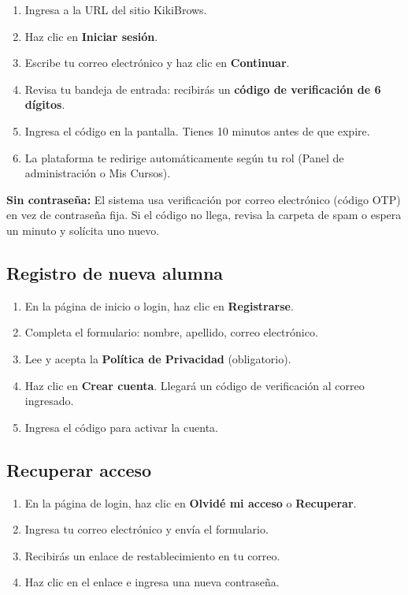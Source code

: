 \documentclass[a4paper,11pt]{article}
\begin{document}
\begin{enumerate}
  \item Ingresa a la URL del sitio KikiBrows.
  \item Haz clic en \textbf{Iniciar sesi\'on}.
  \item Escribe tu correo electr\'onico y haz clic en \textbf{Continuar}.
  \item Revisa tu bandeja de entrada: recibir\'as un \textbf{c\'odigo de verificaci\'on
        de 6 d\'igitos}.
  \item Ingresa el c\'odigo en la pantalla. Tienes 10 minutos antes de que expire.
  \item La plataforma te redirige autom\'aticamente seg\'un tu rol
        (Panel de administraci\'on o Mis Cursos).
\end{enumerate}

\begin{infobox}
\textbf{Sin contrase\~na:} El sistema usa verificaci\'on por correo electr\'onico
(c\'odigo OTP) en vez de contrase\~na fija. Si el c\'odigo no llega, revisa la
carpeta de spam o espera un minuto y sol\'icita uno nuevo.
\end{infobox}

\subsection{Registro de nueva alumna}

\begin{enumerate}
  \item En la p\'agina de inicio o login, haz clic en \textbf{Registrarse}.
  \item Completa el formulario:
        nombre, apellido, correo electr\'onico.
  \item Lee y acepta la \textbf{Pol\'itica de Privacidad} (obligatorio).
  \item Haz clic en \textbf{Crear cuenta}. Llegar\'a un c\'odigo de verificaci\'on
        al correo ingresado.
  \item Ingresa el c\'odigo para activar la cuenta.
\end{enumerate}

\subsection{Recuperar acceso}

\begin{enumerate}
  \item En la p\'agina de login, haz clic en \textbf{Olvidé mi acceso} o
        \textbf{Recuperar}.
  \item Ingresa tu correo electr\'onico y env\'ia el formulario.
  \item Recibir\'as un enlace de restablecimiento en tu correo.
  \item Haz clic en el enlace e ingresa una nueva contrase\~na.
\end{enumerate}
\end{document}
